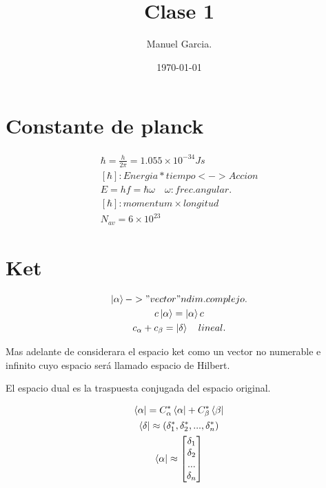 \documentclass{article}
\title{Clase 1}
\author{Manuel Garcia.}
\date{\today}
\newcommand{\caja}[2]{%
  \begin{tcolorbox}[colback=blue!5!white,colframe=blue!25!black,title=#1]
    #2
  \end{tcolorbox}%
}
\begin{document}
\maketitle

\section{Constante de planck}
\caja{$ \hbar  $}{
  \begin{gather}
    \hbar = \frac{h }{2\pi }= 1.055 \times10^{-34}Js\\
    [\hbar ] : Energia *tiempo <-> Accion\\
    E = hf = \hbar \omega \quad \omega : frec. angular.\\
    [\hbar] : momentum \times longitud\\
    N _{av} = 6 \times10^{23}
    \label{eq:hbar }
  \end{gather}
  
}

\section{Ket } %
\label{sec:Ket }
\caja{ket }{
  \begin{gather}
    \ket{\alpha }-> "vector" n dim. complejo.\\
    c \ket{\alpha} = \ket{\alpha } c\\
    c _{\alpha} + c_\beta = \ket{\delta} \quad lineal.
    \label{eq:Ket }
  \end{gather}
}

Mas adelante de considerara el espacio ket como un vector no numerable e infinito cuyo espacio será llamado espacio de Hilbert.

El espacio dual es la traspuesta conjugada del espacio original. 

\caja{Conjugado de $ \ket{\alpha}:\bra{\alpha} $}{
  \begin{gather}
    \bra{\alpha} = C _{\alpha} ^ {* }\bra{\alpha}+C _{\beta} ^ {* } \bra{\beta}\\
    \bra{\delta}\approx (\delta _{1 } ^ {* }, \delta _{2 } ^ {* }, ..., \delta _{n } ^ {* })\\
    \bra{\alpha} \approx \begin{bmatrix}
        \delta _{1 }  \\
        \delta _{2 }  \\
        ...  \\
        \delta _{n } 
    \end{bmatrix} 
    \label{eq:conjugado }
  \end{gather}
}
\end{document}
